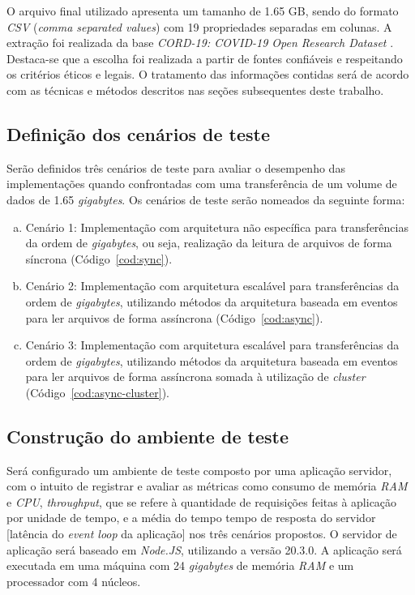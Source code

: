 \documentclass[12pt]{article}
\begin{document}
O arquivo final utilizado apresenta um tamanho de 1.65 GB, sendo do formato \textit{CSV} (\textit{comma separated values}) 
com 19 propriedades separadas em colunas. A extração foi realizada da base 
\textit{CORD-19: COVID-19 Open Research Dataset} \cite{BASE}. Destaca-se que a escolha foi realizada a partir 
de fontes confiáveis e respeitando os critérios éticos e legais. O tratamento das informações contidas será de 
acordo com as técnicas e métodos descritos nas seções subsequentes deste trabalho.


\subsection{Definição dos cenários de teste}


Serão definidos três cenários de teste para avaliar o desempenho das implementações quando confrontadas
com uma transferência de um volume de dados de 1.65 \textit{gigabytes}. Os cenários de teste serão 
nomeados da seguinte forma:

\begin{enumerate}[a)]
\item Cenário 1: Implementação com arquitetura não específica para transferências da ordem de \textit{gigabytes}, 
ou seja, realização da leitura de arquivos de forma síncrona (Código~\ref{cod:sync}).
\item Cenário 2: Implementação com arquitetura escalável para transferências da ordem de \textit{gigabytes}, 
utilizando métodos da arquitetura baseada em eventos para ler arquivos de forma assíncrona (Código~\ref{cod:async}).
\item Cenário 3: Implementação com arquitetura escalável para transferências da ordem de \textit{gigabytes}, 
utilizando métodos da arquitetura baseada em eventos para ler arquivos de forma assíncrona somada à utilização de
\textit{cluster} (Código~\ref{cod:async-cluster}).
\end{enumerate}


\subsection{Construção do ambiente de teste}

Será configurado um ambiente de teste composto por uma aplicação servidor, com o intuito de registrar e avaliar as métricas como consumo
de memória \textit{RAM} e \textit{CPU}, \textit{throughput}, que se refere à quantidade de requisições feitas à aplicação por unidade de tempo,
e a média do tempo tempo de resposta do servidor [latência do \textit{event loop} da aplicação] nos três cenários propostos. 
O servidor de aplicação será baseado em \textit{Node.JS}, utilizando a versão 20.3.0. A aplicação será executada em uma máquina
com 24 \textit{gigabytes} de memória \textit{RAM} e um processador com 4 núcleos.
\end{document}
